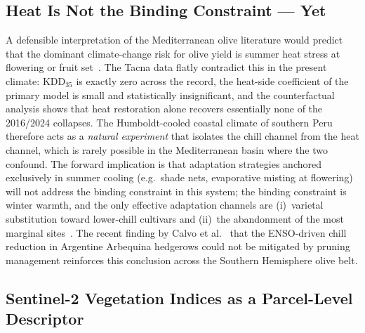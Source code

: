 \documentclass[agronomy,article,submit,pdftex,moreauthors]{Definitions/mdpi}
\begin{document}
\subsection{Heat Is Not the Binding Constraint --- Yet}
\label{sec:discuss_heat}

A defensible interpretation of the Mediterranean olive literature would predict that the dominant climate-change risk for olive yield is summer heat stress at flowering or fruit set~\cite{oteros2014,fraga2020,wortmann2024heat,kaniewski2023olive}. The Tacna data flatly contradict this in the present climate: KDD$_{35}$ is exactly zero across the record, the heat-side coefficient of the primary model is small and statistically insignificant, and the counterfactual analysis shows that heat restoration alone recovers essentially none of the 2016/2024 collapses. The Humboldt-cooled coastal climate of southern Peru therefore acts as a \emph{natural experiment} that isolates the chill channel from the heat channel, which is rarely possible in the Mediterranean basin where the two confound. The forward implication is that adaptation strategies anchored exclusively in summer cooling (e.g.\ shade nets, evaporative misting at flowering) will not address the binding constraint in this system; the binding constraint is winter warmth, and the only effective adaptation channels are (i)~varietal substitution toward lower-chill cultivars and (ii)~the abandonment of the most marginal sites~\cite{erez2024}. The recent finding by Calvo et al.~\cite{calvo2024enso} that the ENSO-driven chill reduction in Argentine Arbequina hedgerows could not be mitigated by pruning management reinforces this conclusion across the Southern Hemisphere olive belt.

\subsection{Sentinel-2 Vegetation Indices as a Parcel-Level Descriptor}
\label{sec:discuss_s2}
\end{document}
